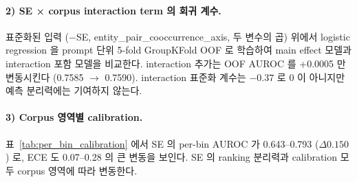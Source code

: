 \documentclass[oneside,ko,under]{snuthesis}
\begin{document}
\paragraph{2) SE × corpus interaction term 의 회귀 계수.}
표준화된 입력 ($-$SE, entity\_pair\_cooccurrence\_axis, 두 변수의 곱) 위에서 logistic regression 을 prompt 단위 5-fold GroupKFold OOF 로 학습하여 main effect 모델과 interaction 포함 모델을 비교한다. interaction 추가는 OOF AUROC 를 +0.0005 만 변동시킨다 (0.7585 $\to$ 0.7590). interaction 표준화 계수는 $-0.37$ 로 0 이 아니지만 예측 분리력에는 기여하지 않는다.

\paragraph{3) Corpus 영역별 calibration.}
표~\ref{tab:per_bin_calibration} 에서 SE 의 per-bin AUROC 가 0.643--0.793 ($\Delta 0.150$) 로, ECE 도 0.07--0.28 의 큰 변동을 보인다. SE 의 ranking 분리력과 calibration 모두 corpus 영역에 따라 변동한다.

\begin{table}[htbp]
\centering
\small
\caption[Corpus 영역별 Semantic Entropy 의 calibration]{entity co-occurrence 10분위 구간 안에서 Semantic Entropy 를 score 로 사용했을 때의 sample 단위 정답률, AUROC, Brier, ECE. 모든 구간 n=3{,}500 (35{,}000 / 10). AUROC 와 ECE 모두 corpus 영역에 따라 큰 폭으로 변동.}
\label{tab:per_bin_calibration}
\end{table}
\end{document}
